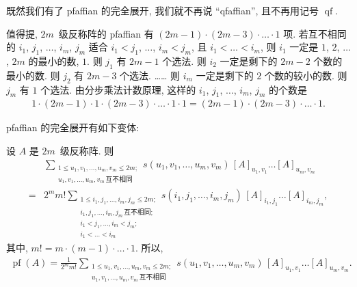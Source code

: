 \documentclass[../libro.tex]{subfiles}
\begin{document}
既然我们有了 pfaffian 的完全展开,
我们就不再说 ``qfaffian'',
且不再用记号 \(\operatorname{qf}\).

值得提, \(2m\)~级反称阵的 pfaffian 有
\((2m-1) \cdot (2m-3) \cdot \dots \cdot 1\) 项.
若互不相同的
\(i_1\), \(j_1\), \(\dots\), \(i_m\), \(j_m\)
适合
\(i_1 < j_1\), \(\dots\), \(i_m < j_m\),
且 \(i_1 < \dots < i_m\),
则 \(i_1\) 一定是 \(1\), \(2\), \(\dots\), \(2m\) 的最小的数, \(1\).
则 \(j_1\) 有 \(2m-1\) 个选法.
则 \(i_2\) 一定是剩下的 \(2m-2\) 个数的最小的数.
则 \(j_2\) 有 \(2m-3\) 个选法.
……
则 \(i_m\) 一定是剩下的 \(2\) 个数的较小的数.
则 \(j_m\) 有 \(1\) 个选法.
由分步乘法计数原理, 这样的
\(i_1\), \(j_1\), \(\dots\), \(i_m\), \(j_m\)
的个数是
\begin{align*}
    1 \cdot (2m-1) \cdot 1 \cdot (2m-3) \cdot \dots \cdot
    1 \cdot 1
    = (2m-1) \cdot (2m-3) \cdot \dots \cdot 1.
\end{align*}

pfaffian 的完全展开有如下变体:

\begin{theorem}
    设 \(A\) 是 \(2m\)~级反称阵.
    则
    \begin{align*}
        &
        \sum_{\substack{
                1 \leq u_1, v_1, \dots, u_m, v_m \leq 2m; \\
                u_1, v_1, \dots, u_m, v_m\,\text{互不相同}
        }}
        {s(u_1, v_1, \dots, u_m, v_m)\,
        [A]_{u_1,v_1} \dots [A]_{u_m,v_m}}
        \\
        = {} &
        2^m m!
        \sum_{\substack{
                1 \leq i_1, j_1, \dots, i_m, j_m \leq 2m;   \\
                i_1, j_1, \dots, i_m, j_m\,\text{互不相同}; \\
                i_1 < j_1, \dots, i_m < j_m;                \\
                i_1 < \dots < i_m
        }}
        {s(i_1, j_1, \dots, i_m, j_m)\,
        [A]_{i_1,j_1} \dots [A]_{i_m,j_m}},
    \end{align*}
    其中,
    \(m! = m \cdot (m-1) \cdot \dots \cdot 1\).
    所以,
    \begin{align*}
        \operatorname{pf} {(A)} =
        \frac{1}{2^m m!}
        \sum_{\substack{
                1 \leq u_1, v_1, \dots, u_m, v_m \leq 2m; \\
                u_1, v_1, \dots, u_m, v_m\,\text{互不相同}
        }}
        {s(u_1, v_1, \dots, u_m, v_m)\,
        [A]_{u_1,v_1} \dots [A]_{u_m,v_m}}.
    \end{align*}
\end{theorem}
\end{document}
